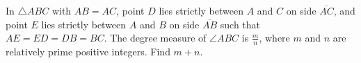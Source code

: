 In $\triangle ABC$ with $AB=AC$, point $D$ lies strictly between $A$ and $C$ on side $\overline{AC}$, and point $E$ lies strictly between $A$ and $B$ on side $\overline{AB}$ such that $AE=ED=DB=BC$. The degree measure of $\angle ABC$ is $\frac{m}{n}$, where $m$ and $n$ are relatively prime positive integers. Find $m+n$.